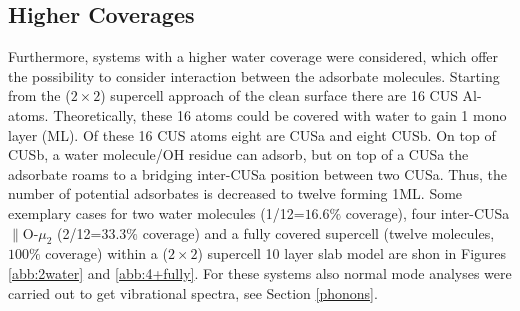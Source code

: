 \documentclass[11pt,DIV=13,BCOR=5mm,a4paper,headinclude]{scrbook}
\begin{document}
\subsection{Higher Coverages}\label{sec:high_cov-ads}

Furthermore, systems with a higher water coverage were considered, which offer the possibility to consider interaction between the adsorbate molecules.
Starting from the ($2\times 2$) supercell approach of the clean surface there are 16 CUS Al-atoms.
Theoretically, these 16 atoms could be covered with water to gain 1 mono layer (ML).
Of these 16 CUS atoms eight are CUSa and eight CUSb.
On top of CUSb, a water molecule/OH residue can adsorb, but on top of a CUSa the adsorbate roams to a bridging inter-CUSa position between two CUSa.
Thus, the number of potential adsorbates is decreased to twelve forming 1ML.
Some exemplary cases for two water molecules (1/12=$16.6\%$ coverage), four inter-CUSa$\parallel$O-$\mu_2$ (2/12=$33.3\%$ coverage) and a fully covered supercell (twelve molecules, $100\%$ coverage) within a ($2\times 2$) supercell 10 layer slab model are shon in Figures \ref{abb:2water} and \ref{abb:4+fully}.
For these systems also normal mode analyses were carried out to get vibrational spectra, see Section \ref{phonons}.
\end{document}
